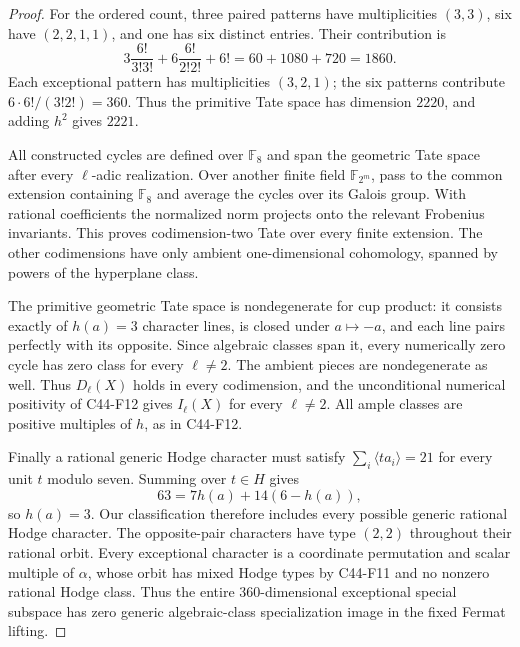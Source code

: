 \documentclass[11pt]{article}
\theoremstyle{remark}\newtheorem{remark}[theorem]{Remark}
\begin{document}
\begin{proof}
For the ordered count, three paired patterns have multiplicities
\((3,3)\), six have \((2,2,1,1)\), and one has six distinct entries.
Their contribution is
\[
 3\frac{6!}{3!3!}+6\frac{6!}{2!2!}+6!
 =60+1080+720=1860.
\]
Each exceptional pattern has multiplicities \((3,2,1)\);
the six patterns contribute \(6\cdot6!/(3!2!)=360\).
Thus the primitive Tate space has dimension \(2220\),
and adding \(h^2\) gives \(2221\).

All constructed cycles are defined over \(\mathbb F _8\) and
span the geometric Tate space after every \(\ell\)-adic realization.
Over another finite field \(\mathbb F _{2^m}\), pass to the common
extension containing \(\mathbb F _8\) and average the cycles over
its Galois group. With rational coefficients the normalized norm
projects onto the relevant Frobenius invariants. This proves
codimension-two Tate over every finite extension. The other
codimensions have only ambient one-dimensional cohomology,
spanned by powers of the hyperplane class.

The primitive geometric Tate space is nondegenerate for cup
product: it consists exactly of \(h(a)=3\) character lines,
is closed under \(a\mapsto-a\), and each line pairs perfectly
with its opposite. Since algebraic classes span it, every
numerically zero cycle has zero class for every \(\ell\ne2\).
The ambient pieces are nondegenerate as well. Thus \(D_\ell(X)\)
holds in every codimension, and the unconditional numerical
positivity of C44-F12 gives \(I_\ell(X)\) for every \(\ell\ne2\).
All ample classes are positive multiples of \(h\), as in C44-F12.

Finally a rational generic Hodge character must satisfy
\(\sum_i\langle ta_i\rangle=21\) for every unit \(t\) modulo seven.
Summing over \(t\in H\) gives
\[
 63=7h(a)+14(6-h(a)),
\]
so \(h(a)=3\). Our classification therefore includes every
possible generic rational Hodge character. The opposite-pair
characters have type \((2,2)\) throughout their rational orbit.
Every exceptional character is a coordinate permutation and
scalar multiple of \(\alpha\), whose orbit has mixed Hodge
types by C44-F11 and no nonzero rational Hodge class.
Thus the entire \(360\)-dimensional exceptional special subspace
has zero generic algebraic-class specialization image in
the fixed Fermat lifting.
\end{proof}


\end{document}
